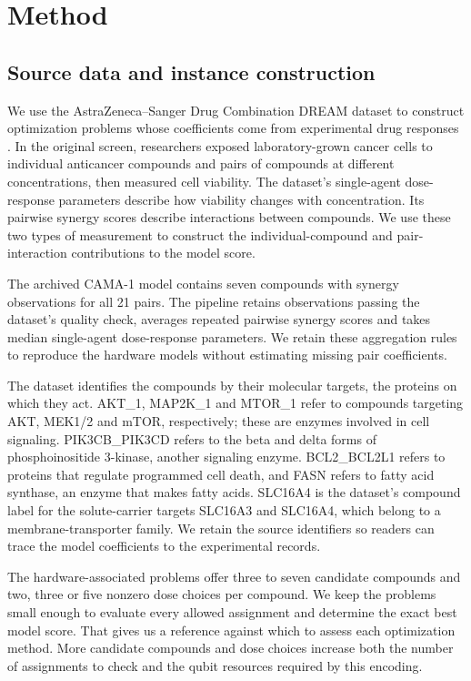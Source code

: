 \documentclass[utf8]{FrontiersinHarvard}
\begin{document}
\section{Method}
\subsection{Source data and instance construction}
We use the AstraZeneca--Sanger Drug Combination DREAM dataset to construct optimization problems whose coefficients come from experimental drug responses \citep{menden2019}. In the original screen, researchers exposed laboratory-grown cancer cells to individual anticancer compounds and pairs of compounds at different concentrations, then measured cell viability. The dataset's single-agent dose-response parameters describe how viability changes with concentration. Its pairwise synergy scores describe interactions between compounds. We use these two types of measurement to construct the individual-compound and pair-interaction contributions to the model score.

The archived CAMA-1 model contains seven compounds with synergy observations for all 21 pairs. The pipeline retains observations passing the dataset's quality check, averages repeated pairwise synergy scores and takes median single-agent dose-response parameters. We retain these aggregation rules to reproduce the hardware models without estimating missing pair coefficients.

The dataset identifies the compounds by their molecular targets, the proteins on which they act. AKT\_1, MAP2K\_1 and MTOR\_1 refer to compounds targeting AKT, MEK1/2 and mTOR, respectively; these are enzymes involved in cell signaling. PIK3CB\_PIK3CD refers to the beta and delta forms of phosphoinositide 3-kinase, another signaling enzyme. BCL2\_BCL2L1 refers to proteins that regulate programmed cell death, and FASN refers to fatty acid synthase, an enzyme that makes fatty acids. SLC16A4 is the dataset's compound label for the solute-carrier targets SLC16A3 and SLC16A4, which belong to a membrane-transporter family. We retain the source identifiers so readers can trace the model coefficients to the experimental records.

The hardware-associated problems offer three to seven candidate compounds and two, three or five nonzero dose choices per compound. We keep the problems small enough to evaluate every allowed assignment and determine the exact best model score. That gives us a reference against which to assess each optimization method. More candidate compounds and dose choices increase both the number of assignments to check and the qubit resources required by this encoding.
\end{document}
